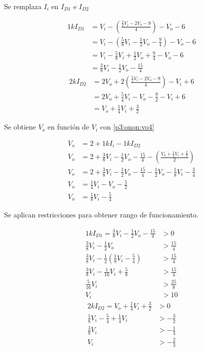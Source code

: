 Se remplaza $I_i$ en $I_{D1}$ e $I_{D2}$

\begin{align*}
  1k I_{D1} &= V_i - \left(\frac{{\frac{5}{2} V_i - 2 V_o - 9}}{4}\right) - V_o - 6
  \\
  &= V_i - \left({\frac{5}{8} V_i - \frac{1}{2} V_o - \frac{9}{4}}\right) - V_o - 6
  \\
  &= V_i - \frac{5}{8} V_i + \frac{1}{2} V_o + \frac{9}{4} - V_o - 6
  \\
  &= \frac{3}{8} V_i - \frac{1}{2} V_o - \frac{15}{4}
\end{align*}
\begin{align*}
  2k I_{D2} &=
    2 V_o +
    2 \left(\frac{{\frac{5}{2} V_i - 2 V_o - 9}}{4}\right) -
    V_i + 6
  \\
  &= 2 V_o + \frac{5}{4} V_i - V_o - \frac{9}{2} - V_i + 6
  \\
  &= V_o + \frac{1}{4} V_i + \frac{3}{2}
  \end{align*}

Se obtiene $V_o$ en función de $V_i$ con \ref{p3:onon:vo4}

\begin{align*}
  V_o &= 2 + 1k I_i - 1k I_{D2}
  \\
  V_o &= 2 +
    \frac{3}{8} V_i - \frac{1}{2} V_o - \frac{15}{4} -
    \left(\frac{V_o + \frac{1}{4} V_i + \frac{3}{2}}{2}\right)
  \\
  V_o &= 2 +
    \frac{3}{8} V_i - \frac{1}{2} V_o - \frac{15}{4} -
    \frac{1}{2} V_o - \frac{1}{8} V_i - \frac{3}{4}
  \\
  V_o &= \frac{1}{4} V_i - V_o - \frac{5}{2}
  \\
  V_o &= \frac{1}{8} V_i - \frac{5}{4}
\end{align*}

Se aplican restricciones para obtener rango de funcionamiento.

\begin{align*}
  1k I_{D1} = \frac{3}{8} V_i - \frac{1}{2} V_o - \frac{15}{4} &> 0
  \\
  \frac{3}{8} V_i - \frac{1}{2} V_o &> \frac{15}{4}
  \\
  \frac{3}{8} V_i - \frac{1}{2} \left(\frac{1}{8} V_i - \frac{5}{4}\right) &> \frac{15}{4}
  \\
  \frac{3}{8} V_i - \frac{1}{16} V_i + \frac{5}{8} &> \frac{15}{4}
  \\
  \frac{5}{16} V_i &> \frac{25}{8}
  \\
  V_i &> 10
\end{align*}
\begin{align*}
  2k I_{D2} = V_o + \frac{1}{4} V_i + \frac{3}{2} &> 0
  \\
  \frac{1}{8} V_i - \frac{5}{4} + \frac{1}{4} V_i &> -\frac{3}{2}
  \\
  \frac{3}{8} V_i &> -\frac{1}{4}
  \\
  V_i &> -\frac{2}{3}
\end{align*}
